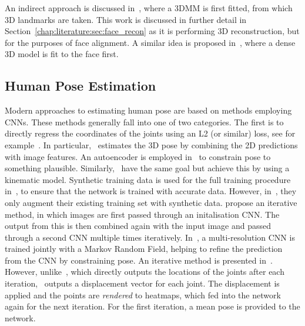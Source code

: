 An indirect approach is discussed in~\cite{zhu2016face}, where a 3DMM
is first fitted, from which 3D landmarks are taken. This work is
discussed in further detail in
Section~\ref{chap:literature:sec:face_recon} as it is performing 3D
reconstruction, but for the purposes of face alignment. A similar idea
is proposed in~\cite{jourabloo2016large}, where a dense 3D model is
fit to the face first.

\subsection{Human Pose Estimation}


Modern approaches to estimating human pose are based on methods
employing CNNs. These methods generally fall into one of two
categories. The first is to directly regress the coordinates of the
joints using an L2 (or similar) loss, see for
example~\cite{li20143d,park20163d,tekin2016structured,tekin2016direct,zhou2016deep,chen2016synthesizing,ghezelghieh2016learning,toshev2014deeppose,tompson2014joint}. In
particular,~\cite{park20163d} estimates the 3D pose by combining the
2D predictions with image features. An autoencoder is employed
in~\cite{tekin2016structured} to constrain pose to something
plausible. Similarly,~\cite{zhou2016deep} have the same goal but
achieve this by using a kinematic model. Synthetic training data is
used for the full training procedure in~\cite{chen2016synthesizing},
to ensure that the network is trained with accurate data. However,
in~\cite{ghezelghieh2016learning}, they only augment their existing
training set with synthetic
data. \citeauthor{toshev2014deeppose}\cite{toshev2014deeppose} propose
an iterative method, in which images are first passed through an
initalisation CNN. The output from this is then combined again with
the input image and passed through a second CNN multiple times
iteratively.  In~\cite{tompson2014joint}, a multi-resolution CNN is
trained jointly with a Markov Random Field, helping to refine the
prediction from the CNN by constraining pose. An iterative method is
presented in~\cite{carreira2016human}. However,
unlike~\cite{toshev2014deeppose}, which directly outputs the locations
of the joints after each iteration,~\cite{carreira2016human} outputs a
displacement vector for each joint. The displacement is applied and
the points are \textit{rendered} to heatmaps, which fed into the
network again for the next iteration. For the first iteration, a mean
pose is provided to the network.


